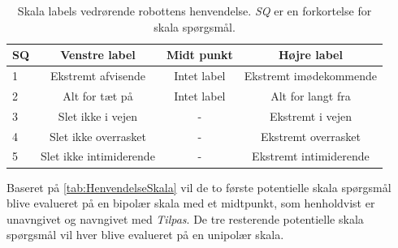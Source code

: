 \begin{table}[H]
	\centering
	\begin{tabular}{l|c|c|c}
		SQ     & Venstre label & Midt punkt & Højre label \\\hline
		1   & Ekstremt afvisende & Intet label & Ekstremt imødekommende         \\\hline
		2   & Alt for tæt på & Intet label & Alt for langt fra   \\\hline
		3   & Slet ikke i vejen & -  & Ekstremt i vejen  \\\hline
	 	4   & Slet ikke overrasket &  -  & Ekstremt overrasket \\\hline
		5   & Slet ikke intimiderende & - & Ekstremt intimiderende           
	\end{tabular}
	\caption{Skala labels vedrørende robottens henvendelse. \textit{SQ} er en forkortelse for skala spørgsmål.}
	\label{tab:HenvendelseSkala} 
\end{table}
\noindent
%
Baseret på \autoref{tab:HenvendelseSkala} vil de to første potentielle skala spørgsmål blive evalueret på en bipolær skala med et midtpunkt, som henholdvist er unavngivet og navngivet med \textit{Tilpas}. De tre resterende potentielle skala spørgsmål vil hver blive evalueret på en unipolær skala.
\newpage
%
